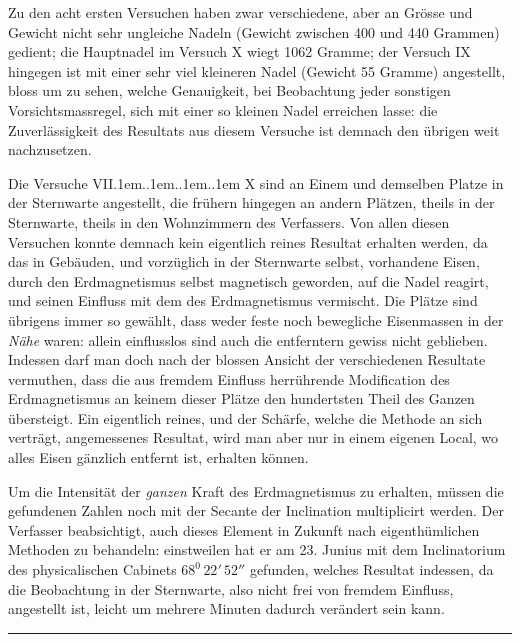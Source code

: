 Zu den acht ersten Versuchen haben zwar verschiedene, aber an
Grösse und Gewicht nicht sehr ungleiche Nadeln (Gewicht zwischen
400 und 440 Grammen) gedient; die Hauptnadel im Versuch X wiegt
1062 Gramme; der Versuch IX hingegen ist mit einer sehr viel
kleineren Nadel (Gewicht 55 Gramme) angestellt, bloss um zu sehen,
welche Genauigkeit, bei Beobachtung jeder sonstigen
\clearpage
{}
\noindent
Vorsichtsmassregel, sich mit einer so kleinen Nadel erreichen
lasse: die Zuverlässigkeit des Resultats aus diesem Versuche
ist demnach den übrigen weit nachzusetzen.

Die Versuche VII\kern.1em.\kern.1em.\kern.1em.\kern.1em X sind
an Einem und demselben Platze in der Sternwarte angestellt,
die frühern hingegen an andern Plätzen, theils in der Sternwarte,
theils in den Wohnzimmern des Verfassers. Von allen diesen
Versuchen konnte demnach kein eigentlich reines Resultat erhalten
werden, da das in Gebäuden, und vorzüglich in der Sternwarte selbst,
vorhandene Eisen, durch den Erdmagnetismus selbst magnetisch
geworden, auf die Nadel reagirt, und seinen Einfluss mit dem
des Erdmagnetismus vermischt. Die Plätze sind übrigens immer
so gewählt, dass weder feste noch bewegliche Eisenmassen in
der \textit{Nähe} waren: allein einflusslos sind auch die
entferntern gewiss nicht geblieben. Indessen darf man doch
nach der blossen Ansicht der verschiedenen Resultate vermuthen,
dass die aus fremdem Einfluss herrührende Modification des
Erdmagnetismus an keinem dieser Plätze den hundertsten Theil
des Ganzen übersteigt. Ein eigentlich reines, und der Schärfe,
welche die Methode an sich verträgt, angemessenes Resultat,
wird man aber nur in einem eigenen Local, wo alles Eisen
gänzlich entfernt ist, erhalten können.

Um die Intensität der \textit{ganzen} Kraft des Erdmagnetismus
zu erhalten, müssen die gefundenen Zahlen noch mit der
Secante der Inclination multiplicirt werden. Der Verfasser
beabsichtigt, auch dieses Element in Zukunft nach eigenthümlichen
Methoden zu behandeln: einstweilen hat er am 23. Junius mit
dem Inclinatorium des physicalischen Cabinets $68^0\,22'\,52''$
gefunden, welches Resultat indessen, da die Beobachtung in
der Sternwarte, also nicht frei von fremdem Einfluss,
angestellt ist, leicht um mehrere Minuten dadurch
verändert sein kann.
\begin{center}
\rule{.25\linewidth}{.4pt}
\end{center}
